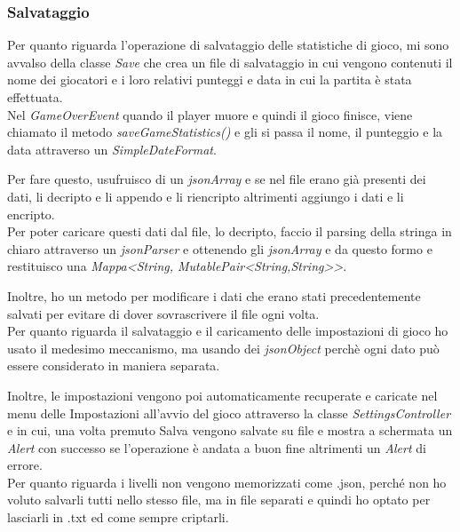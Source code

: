 \subsubsection*{Salvataggio}

\textsf{\small Per quanto riguarda l'operazione di salvataggio delle statistiche di gioco, mi sono avvalso della classe \emph{Save} che crea un file di salvataggio in cui vengono contenuti il nome dei giocatori e i loro relativi punteggi e data in cui la partita è stata effettuata.} \\

\textsf{\small Nel \emph{GameOverEvent} quando il player muore e quindi il gioco finisce, viene chiamato il metodo \emph{saveGameStatistics()} e gli si passa il nome, il punteggio e la data attraverso un \emph{SimpleDateFormat}.}

\textsf{\small Per fare questo, usufruisco di un \emph{jsonArray} e se nel file erano già presenti dei dati, li decripto e li appendo e li riencripto altrimenti aggiungo i dati e li encripto.} \\

\textsf{\small Per poter caricare questi dati dal file, lo decripto, faccio il parsing della stringa in chiaro attraverso un \emph{jsonParser} e ottenendo gli \emph{jsonArray} e da questo formo e restituisco una \emph{Mappa<String, MutablePair<String,String>>}.}

\textsf{\small Inoltre, ho un metodo per modificare i dati che erano stati precedentemente salvati per evitare di dover sovrascrivere il file ogni volta.}\\

\textsf{\small Per quanto riguarda il salvataggio e il caricamento delle impostazioni di gioco ho usato il medesimo meccanismo, ma usando dei \emph{jsonObject} perchè ogni dato può essere considerato in maniera separata.}

\textsf{\small Inoltre, le impostazioni vengono poi automaticamente recuperate e caricate nel menu delle Impostazioni all'avvio del gioco attraverso la classe \emph{SettingsController} e in cui, una volta premuto Salva vengono salvate su file e mostra a schermata un \emph{Alert} con successo se l'operazione è andata a buon fine altrimenti un \emph{Alert} di errore.} \\

\textsf{\small Per quanto riguarda i livelli non vengono memorizzati come .json, perché non ho voluto salvarli tutti nello stesso file, ma in file separati e quindi ho optato per lasciarli in .txt ed come sempre criptarli. }

